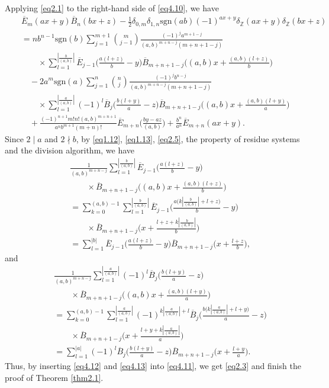 \documentclass[reqno]{amsart}
\numberwithin{equation}{section}
\begin{document}
Applying \eqref{eq2.1} to the right-hand side of \eqref{eq4.10}, we have
\begin{eqnarray}\label{eq4.11}
&&\overline{E}_{m}(ax+y)\overline{B}_{n}(bx+z)-\frac{1}{2}\delta_{0,m}\delta_{1,n}\mathrm{sgn}(ab)(-1)^{ax+y}\delta_{\mathbb{Z}}(ax+y)\delta_{\mathbb{Z}}(bx+z)\nonumber\\
&&=nb^{n-1}\mathrm{sgn}(b)
\sum_{j=1}^{m+1}\binom{m}{j-1}\frac{(-1)^{j}a^{m+1-j}}{(a,b)^{m+n-j}(m+n+1-j)}\nonumber\\
&&\qquad\times\sum_{l=1}^{|\frac{b}{(a,b)}|}
\overline{E}_{j-1}\biggl(\frac{a(l+z)}{b}-y\biggl)\overline{B}_{m+n+1-j}\biggl((a,b)x+\frac{(a,b)(l+z)}{b}\biggl)\nonumber\\
&&\quad-2a^{m}\mathrm{sgn}(a)\sum_{j=1}^{n}\binom{n}{j}\frac{(-1)^{j}b^{n-j}}{(a,b)^{m+n-j}(m+n+1-j)}\nonumber\\
&&\qquad\times\sum_{l=1}^{|\frac{a}{(a,b)}|}(-1)^{l}\overline{B}_{j}\biggl(\frac{b(l+y)}{a}-z\biggl)\overline{B}_{m+n+1-j}\biggl((a,b)x+\frac{(a,b)(l+y)}{a}\biggl)\nonumber\\
&&\quad+\frac{(-1)^{n+1}m!n!(a,b)^{m+n+1}}{a^{n}b^{m+1}(m+n)!}\overline{E}_{m+n}\biggl(\frac{by-az}{(a,b)}\biggl)+\frac{b^{n}}{a^{n}}\overline{E}_{m+n}(ax+y).
\end{eqnarray}
Since $2\mid a$ and $2\nmid b$, by \eqref{eq1.12}, \eqref{eq1.13}, \eqref{eq2.5}, the property of residue systems and the division algorithm, we have
\begin{eqnarray}\label{eq4.12}
&&\frac{1}{(a,b)^{m+n-j}}\sum_{l=1}^{|\frac{b}{(a,b)}|}
\overline{E}_{j-1}\biggl(\frac{a(l+z)}{b}-y\biggl)\nonumber\\
&&\qquad\times\overline{B}_{m+n+1-j}\biggl((a,b)x+\frac{(a,b)(l+z)}{b}\biggl)\nonumber\\
&&=\sum_{k=0}^{(a,b)-1}\sum_{l=1}^{|\frac{b}{(a,b)}|}\overline{E}_{j-1}\biggl(\frac{a\bigl(k|\frac{b}{(a,b)}|+l+z\bigl)}{b}-y\biggl)\nonumber\\
&&\qquad\times\overline{B}_{m+n+1-j}\biggl(x+\frac{l+z+k|\frac{b}{(a,b)}|}{b}\biggl)\nonumber\\
&&=\sum_{l=1}^{|b|}\overline{E}_{j-1}\biggl(\frac{a(l+z)}{b}-y\biggl)\overline{B}_{m+n+1-j}\biggl(x+\frac{l+z}{b}\biggl),
\end{eqnarray}
and
\begin{eqnarray}\label{eq4.13}
&&\frac{1}{(a,b)^{m+n-j}}\sum_{l=1}^{|\frac{a}{(a,b)}|}(-1)^{l}\overline{B}_{j}\biggl(\frac{b(l+y)}{a}-z\biggl)\nonumber\\
&&\qquad\times\overline{B}_{m+n+1-j}\biggl((a,b)x+\frac{(a,b)(l+y)}{a}\biggl)\nonumber\\
&&=\sum_{k=0}^{(a,b)-1}\sum_{l=1}^{|\frac{a}{(a,b)}|}(-1)^{k|\frac{a}{(a,b)}|+l}\overline{B}_{j}\biggl(\frac{b\bigl(k|\frac{a}{(a,b)}|+l+y\bigl)}{a}-z\biggl)\nonumber\\
&&\qquad\times\overline{B}_{m+n+1-j}\biggl(x+\frac{l+y+k|\frac{a}{(a,b)}|}{a}\biggl)\nonumber\\
&&=\sum_{l=1}^{|a|}(-1)^{l}\overline{B}_{j}\biggl(\frac{b(l+y)}{a}-z\biggl)\overline{B}_{m+n+1-j}\biggl(x+\frac{l+y}{a}\biggl).
\end{eqnarray}
Thus, by inserting \eqref{eq4.12} and \eqref{eq4.13} into \eqref{eq4.11}, we get \eqref{eq2.3} and finish the proof of Theorem \ref{thm2.1}.
\end{document}
